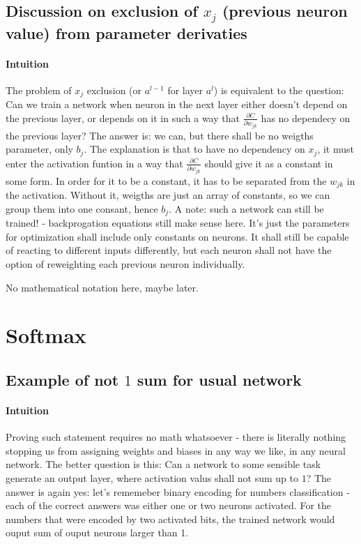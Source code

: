 \documentclass{article}
\begin{document}
\subsection{Discussion on exclusion of $x_j$ (previous neuron value) from parameter derivaties}
\paragraph{Intuition}
The problem of $x_j$ exclusion (or $a^{l-1}$ for layer $a^l$) is equivalent to the question:
Can we train a network when neuron in the next layer either doesn't depend on the previous layer, or depends on it in such a way that
$\frac{\partial C}{\partial w_{jk}}$ has no dependecy on the previous layer? 
The answer is: we can, but there shall be no weigths parameter, only $b_j$. 
The explanation is that to have no dependency on $x_j$, it must enter the activation funtion in a way that $\frac{\partial C}{\partial w_{jk}}$ should give it as a constant in some form. In order for it to be a constant, it has to be separated from the $w_{jk}$ in the activation. Without it, weigths are just an array of constants, so we can group them into one consant, hence $b_j$. 
A note: such a network can still be trained! - backprogation equations still make sense here. It's just the parameters for optimization shall include only constants on neurons. It shall still be capable of reacting to different inputs differently, but each neuron shall not have the option of reweighting each previous neuron individually.

No mathematical notation here, maybe later.

\section{Softmax}

\subsection{Example of not $1$ sum for usual network}
\paragraph{Intuition}
Proving such statement requires no math whatsoever - there is literally nothing stopping us from assigning
weights and biases in any way we like, in any neural network. The better question is this:
Can a network to some sensible task generate an output layer, where activation valus shall not sum up to $1$?
The answer is again yes: let's rememeber binary encoding for numbers classification - each of the correct answers was
either one or two neurons activated. For the numbers that were encoded by two activated bits, the trained network would ouput 
sum of ouput neurons larger than 1.
\end{document}
